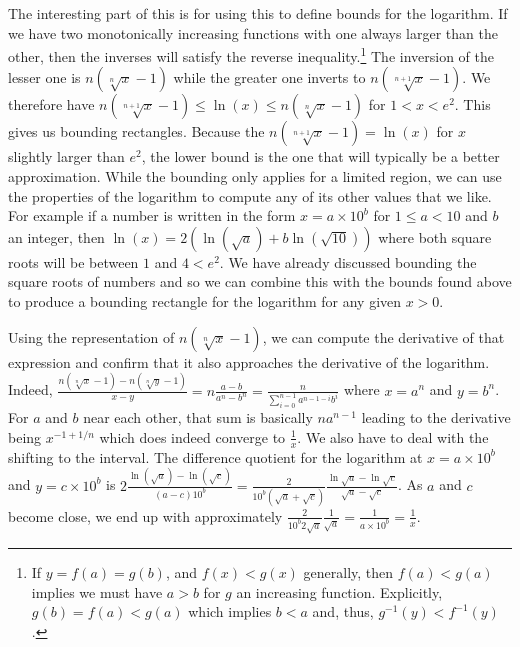 \documentclass[12pt]{article}
\begin{document}
The interesting part of this is for using this to define bounds for the logarithm. If we have two monotonically increasing functions with one always larger than the other, then the inverses will satisfy the reverse inequality.\footnote{If $y = f(a)=g(b)$, and $f(x) < g(x)$ generally, then $f(a) < g(a)$ implies we must have $a > b$ for $g$ an increasing function. Explicitly, $g(b) = f(a) < g(a)$ which implies $b < a$ and, thus, $g^{-1} (y) < f^{-1} (y)$.}  The inversion of the lesser one is $n(\sqrt[n]{ x }- 1)$ while the greater one inverts to $n(\sqrt[n+1]{x} - 1)$. We therefore have $n(\sqrt[n+1]{x} - 1) \leq \ln(x) \leq n (\sqrt[n]{x}-1)$ for $1 < x < e^2$. This gives us bounding rectangles. Because the $n (\sqrt[n+1]{x} - 1) = \ln(x)$ for $x$ slightly larger than $e^2$, the lower bound is the one that will typically be a better approximation.  While the bounding only applies for a limited region, we can use the properties of the logarithm to compute any of its other values that we like. For example if a number is written in the form $x=a\times 10^b$ for $1 \leq a < 10$ and $b$ an integer, then $\ln(x) = 2 ( \ln( \sqrt{a} ) + b \ln(\sqrt{10}) )$ where both square roots will be between $1$ and $4< e^2$. We have already discussed bounding the square roots of numbers and so we can combine this with the bounds found above to produce a bounding rectangle for the logarithm for any given $x>0$. 

Using the representation of $ n (\sqrt[n]{x}-1)$, we can compute the derivative of that expression and confirm that it also approaches the derivative of the logarithm. Indeed, $\frac{ n (\sqrt[n]{x}-1) -  n (\sqrt[n]{y}-1)}{x-y} = n \frac{a-b}{a^n -b^n} = \frac{n}{\sum_{i=0}^{n-1} a^{n-1-i} b^i}$ where $x = a^n$ and $y = b^n$.  For $a$ and $b$ near each other, that sum is basically $n a^{n-1}$ leading to the derivative being $x^{-1+1/n}$ which does indeed converge to $\frac{1}{x}$. We also have to deal with the shifting to the interval. The difference quotient for the logarithm at $x = a\times 10^b$ and $y = c \times 10^b$ is $2 \frac{\ln(\sqrt{a}) - \ln(\sqrt{c})}{(a-c)10^b} = \frac{2}{10^b(\sqrt{a}+\sqrt{c})} \frac{\ln \sqrt{a} - \ln \sqrt{c} }{\sqrt{a}- \sqrt{c}} $. As $a$ and $c$ become close, we end up with approximately $\frac{2}{10^b 2 \sqrt{a}} \frac{1}{\sqrt{a}} = \frac{1}{a\times 10^b} = \frac{1}{x}$.


\printbibliography
\end{document}
